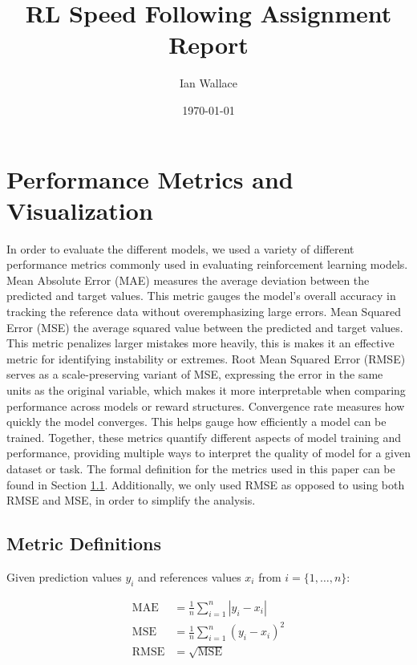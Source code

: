 \documentclass[11pt]{article}
\title{RL Speed Following Assignment Report}
\author{Ian Wallace}
\date{\today}
\begin{document}
\maketitle

\section{Performance Metrics and Visualization}
In order to evaluate the different models, we used a variety of different performance metrics commonly used in evaluating reinforcement learning models. Mean Absolute Error (MAE) measures the average deviation between the predicted and target values. This metric gauges the model’s overall accuracy in tracking the reference data without overemphasizing large errors. Mean Squared Error (MSE) the average squared value between the predicted and target values. This metric penalizes larger mistakes more heavily, this is makes it an effective metric for identifying instability or extremes. Root Mean Squared Error (RMSE) serves as a scale-preserving variant of MSE, expressing the error in the same units as the original variable, which makes it more interpretable when comparing performance across models or reward structures. Convergence rate measures how quickly the model converges. This helps gauge how efficiently a model can be trained. Together, these metrics quantify different aspects of model training and performance, providing multiple ways to interpret the quality of model for a given dataset or task. The formal definition for the metrics used in this paper can be found in Section \ref{sec:metric-definitions}. Additionally, we only used RMSE as opposed to using both RMSE and MSE, in order to simplify the analysis.

\subsection{Metric Definitions}\label{sec:metric-definitions}

Given prediction values $y_i$ and references values $x_i$ from $i=\{1,\dots,n\}$:

\begin{align}\label{align:defs}
\text{MAE} &= \frac{1}{n} \sum_{i=1}^n |y_i - x_i| \\
\text{MSE} &= \frac{1}{n} \sum_{i=1}^n (y_i - x_i)^2 \\
\text{RMSE} &= \sqrt{\text{MSE}}
\end{align}

\end{document}
